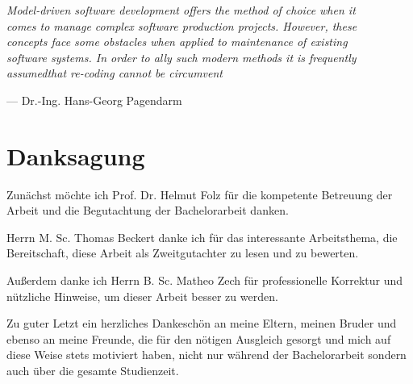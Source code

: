 
\begin{flushright}{\slshape    
    Model-driven software development offers the method of choice when it \\ 
    comes to manage complex software production projects. However, these\\ 
    concepts face some obstacles when applied to maintenance of existing\\
    software systems. In order to ally such modern methods it is frequently\\
    assumedthat re-coding cannot be circumvent} \\ \medskip
     
    --- Dr.-Ing. Hans-Georg Pagendarm \cite{knuth:1974}
\end{flushright}

\bigskip

\begingroup
	\let\clearpage\relax
	\let\cleardoublepage\relax
	\let\cleardoublepage\relax
	\chapter*{Danksagung}
	
	Zunächst möchte ich Prof. Dr. Helmut Folz für die kompetente Betreuung der Arbeit und die Begutachtung der Bachelorarbeit danken.
	
	Herrn M. Sc. Thomas Beckert danke ich für das interessante Arbeitsthema, die Bereitschaft, diese Arbeit als Zweitgutachter zu lesen und zu bewerten.
	
	Außerdem danke ich Herrn B. Sc. Matheo Zech für professionelle Korrektur und nützliche Hinweise, um dieser Arbeit besser zu werden.
	
	Zu guter Letzt ein herzliches Dankeschön an meine Eltern, meinen Bruder und ebenso
	an meine Freunde, die für den nötigen Ausgleich gesorgt und mich auf diese Weise stets
	motiviert haben, nicht nur während der Bachelorarbeit sondern auch über die gesamte
	Studienzeit.
\endgroup

